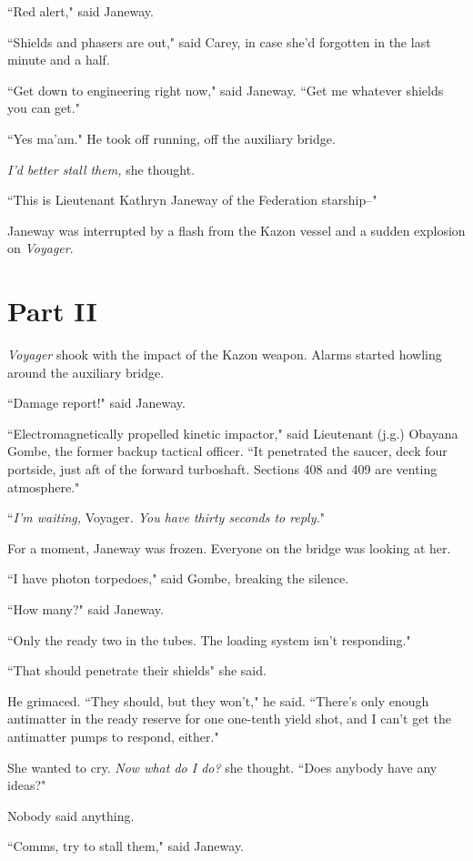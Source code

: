 \documentclass[twoside,letterpaper,12pt]{memoir}
\begin{document}
``Red alert," said Janeway.

``Shields and phasers are out," said Carey, in case she’d forgotten in the last minute and a half.

``Get down to engineering right now," said Janeway. ``Get me whatever shields you can get."

``Yes ma'am." He took off running, off the auxiliary bridge.

\textit{I'd better stall them, }she thought.

``This is Lieutenant Kathryn Janeway of the Federation starship--"

Janeway was interrupted by a flash from the Kazon vessel and a sudden explosion on \textit{Voyager}.

\chapter*{Part II}

\textit{Voyager} shook with the impact of the Kazon weapon. Alarms started howling around the auxiliary bridge.

``Damage report!" said Janeway.

``Electromagnetically propelled kinetic impactor," said Lieutenant (j.g.) Obayana Gombe, the former backup tactical officer. ``It penetrated the saucer, deck four portside, just aft of the forward turboshaft. Sections 408 and 409 are venting atmosphere."

``\textit{I'm waiting, }Voyager\textit{. You have thirty seconds to reply.}"

For a moment, Janeway was frozen. Everyone on the bridge was looking at her.

``I have photon torpedoes," said Gombe, breaking the silence.

``How many?" said Janeway.

``Only the ready two in the tubes. The loading system isn't responding."

``That should penetrate their shields" she said.

He grimaced. ``They should, but they won't," he said. ``There's only enough antimatter in the ready reserve for one one-tenth yield shot, and I can't get the antimatter pumps to respond, either."

She wanted to cry. \textit{Now what do I do?} she thought. ``Does anybody have any ideas?"

Nobody said anything.

``Comms, try to stall them," said Janeway.
\end{document}
